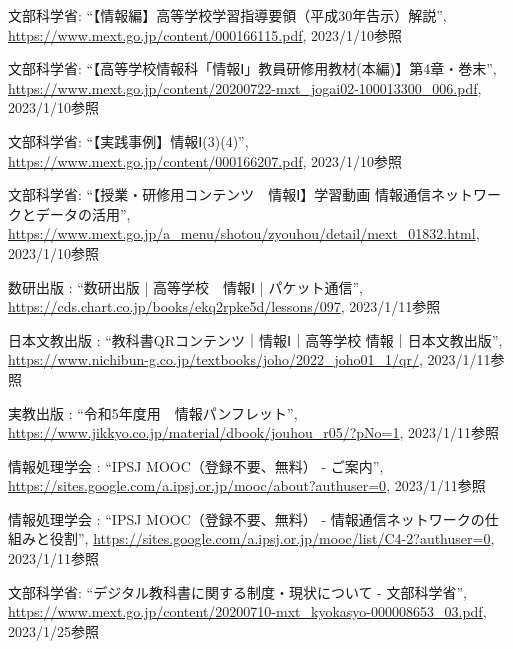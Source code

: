 \documentclass[12pt,a4j,titlepage]{ltjsarticle}
\begin{document}
\begin{thebibliography}{99}
 文部科学省: ``【情報編】高等学校学習指導要領（平成30年告示）解説'', \url{https://www.mext.go.jp/content/000166115.pdf}, 2023/1/10参照

 文部科学省: ``【高等学校情報科「情報Ⅰ」教員研修用教材(本編)】第4章・巻末'', \url{https://www.mext.go.jp/content/20200722-mxt_jogai02-100013300_006.pdf}, 2023/1/10参照

 文部科学省: ``【実践事例】情報Ⅰ(3)(4)'', \url{https://www.mext.go.jp/content/000166207.pdf}, 2023/1/10参照

 文部科学省: ``【授業・研修用コンテンツ　情報Ⅰ】学習動画 情報通信ネットワークとデータの活用'', \url{https://www.mext.go.jp/a_menu/shotou/zyouhou/detail/mext_01832.html}, 2023/1/10参照

 数研出版 : ``数研出版 | 高等学校　情報Ⅰ | パケット通信'', \url{https://cds.chart.co.jp/books/ekq2rpke5d/lessons/097}, 2023/1/11参照

 日本文教出版 : ``教科書QRコンテンツ｜情報Ⅰ｜高等学校 情報｜日本文教出版'', \url{https://www.nichibun-g.co.jp/textbooks/joho/2022_joho01_1/qr/}, 2023/1/11参照

 実教出版 : ``令和5年度用　情報パンフレット'', \url{https://www.jikkyo.co.jp/material/dbook/jouhou_r05/?pNo=1}, 2023/1/11参照

 情報処理学会 : ``IPSJ MOOC（登録不要、無料） - ご案内'', \url{https://sites.google.com/a.ipsj.or.jp/mooc/about?authuser=0}, 2023/1/11参照

 情報処理学会 : ``IPSJ MOOC（登録不要、無料） - 情報通信ネットワークの仕組みと役割'', \url{https://sites.google.com/a.ipsj.or.jp/mooc/list/C4-2?authuser=0}, 2023/1/11参照

 文部科学省: ``デジタル教科書に関する制度・現状について - 文部科学省'', \url{https://www.mext.go.jp/content/20200710-mxt_kyokasyo-000008653_03.pdf}, 2023/1/25参照
\end{thebibliography}
\end{document}
